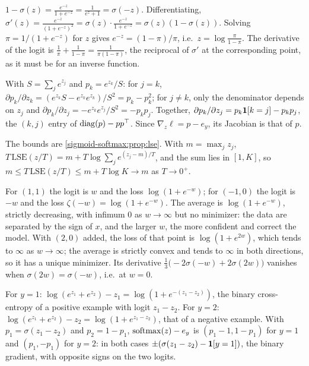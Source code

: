 \section{}

$1 - \sigma(z) = \frac{e^{-z}}{1 + e^{-z}} = \frac1{e^z + 1} = \sigma(-z)$. Differentiating,
$\sigma'(z) = \frac{e^{-z}}{(1 + e^{-z})^2} = \sigma(z)\cdot\frac{e^{-z}}{1 + e^{-z}} = \sigma(z)(1 - \sigma(z))$. Solving $\pi = 1/(1 + e^{-z})$ for $z$ gives
$e^{-z} = (1 - \pi)/\pi$, i.e.\ $z = \log\frac\pi{1 - \pi}$. The derivative of the logit is
$\frac1\pi + \frac1{1 - \pi} = \frac1{\pi(1 - \pi)}$, the reciprocal of $\sigma'$ at the corresponding point, as it must be for an
inverse function.

With $S = \sum_je^{z_j}$ and $p_k = e^{z_k}/S$: for $j = k$,
$\partial p_k/\partial z_k = (e^{z_k}S - e^{z_k}e^{z_k})/S^2 = p_k - p_k^2$; for $j\neq k$, only the denominator depends on
$z_j$ and $\partial p_k/\partial z_j = -e^{z_k}e^{z_j}/S^2 = -p_kp_j$. Together,
$\partial p_k/\partial z_j = p_k\mathbf{1}[k = j] - p_kp_j$, the $(k,j)$ entry of $\operatorname{diag}(p) - pp^\top$. Since
$\nabla_z\ell = p - e_y$, its Jacobian is that of $p$.

The bounds are \cref{sigmoid-softmax:prop:lse}. With $m = \max_jz_j$,
$T\,\mathrm{LSE}(z/T) = m + T\log\sum_je^{(z_j - m)/T}$, and the sum lies in $[1, K]$, so
$m\leq T\,\mathrm{LSE}(z/T)\leq m + T\log K\to m$ as $T\to0^+$.

For $(1, 1)$ the logit is $w$ and the loss $\log(1 + e^{-w})$; for $(-1, 0)$ the logit is $-w$ and the loss
$\zeta(-w) = \log(1 + e^{-w})$. The average is $\log(1 + e^{-w})$, strictly decreasing, with infimum $0$ as
$w\to\infty$ but no minimizer: the data are separated by the sign of $x$, and the larger $w$, the
more confident and correct the model. With $(2, 0)$ added, the loss of that point is
$\log(1 + e^{2w})$, which tends to $\infty$ as $w\to\infty$; the average is strictly convex and tends to $\infty$
in both directions, so it has a unique minimizer. Its derivative
$\frac13\bigl(-2\sigma(-w) + 2\sigma(2w)\bigr)$ vanishes when $\sigma(2w) = \sigma(-w)$, i.e.\ at $w = 0$.

For $y = 1$: $\log(e^{z_1} + e^{z_2}) - z_1 = \log(1 + e^{-(z_1 - z_2)})$, the binary cross-entropy of a positive
example with logit $z_1 - z_2$. For $y = 2$: $\log(e^{z_1} + e^{z_2}) - z_2 = \log(1 + e^{z_1 - z_2})$, that of a
negative example. With $p_1 = \sigma(z_1 - z_2)$ and $p_2 = 1 - p_1$, $\operatorname{softmax}(z) - e_y$ is
$(p_1 - 1, 1 - p_1)$ for $y = 1$ and $(p_1, -p_1)$ for $y = 2$: in both cases
$\pm(\sigma(z_1 - z_2) - \mathbf{1}[y = 1])$, the binary gradient, with opposite signs on the two logits.

